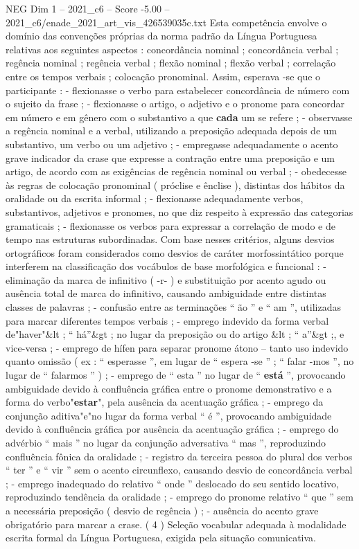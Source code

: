 \begin{textsample}{NEG Dim 1 – 2021\_c6 – Score -5.00 – 2021\_c6/enade\_2021\_art\_vis\_426539035c.txt}
Esta competência envolve o domínio das convenções próprias da norma padrão da Língua Portuguesa relativas aos seguintes aspectos : concordância nominal ; concordância verbal ; regência nominal ; regência verbal ; flexão nominal ; flexão verbal ; correlação entre os tempos verbais ; colocação pronominal.
Assim, esperava -se que o participante : - flexionasse o verbo para estabelecer concordância de número com o sujeito da frase ; - flexionasse o artigo, o adjetivo e o pronome para concordar em número e em gênero com o substantivo a que \textbf{cada} um se refere ; - observasse a regência nominal e a verbal, utilizando a preposição adequada depois de um substantivo, um verbo ou um adjetivo ; - empregasse adequadamente o acento grave indicador da crase que expresse a contração entre uma preposição e um artigo, de acordo com as exigências de regência nominal ou verbal ; - obedecesse às regras de colocação pronominal ( próclise e ênclise ), distintas dos hábitos da oralidade ou da escrita informal ; - flexionasse adequadamente verbos, substantivos, adjetivos e pronomes, no que diz respeito à expressão das categorias gramaticais ; - flexionasse os verbos para expressar a correlação de modo e de tempo nas estruturas subordinadas.
Com base nesses critérios, alguns desvios ortográficos foram considerados como desvios de caráter morfossintático porque interferem na classificação dos vocábulos de base morfológica e funcional : - eliminação da marca de infinitivo ( -r- ) e substituição por acento agudo ou ausência total de marca do infinitivo, causando ambiguidade entre distintas classes de palavras ; - confusão entre as terminações “ ão ” e “ am ”, utilizadas para marcar diferentes tempos verbais ; - emprego indevido da forma verbal de"haver"\&lt ; “ há”\&gt ; no lugar da preposição ou do artigo \&lt ; “ a”\&gt ;, e vice-versa ; - emprego de hífen para separar pronome átono – tanto uso indevido quanto omissão ( ex : “ esperasse ”, em lugar de “ espera -se ” ; “ falar -mos ”, no lugar de “ falarmos ” ) ; - emprego de “ esta ” no lugar de “ \textbf{está} ”, provocando ambiguidade devido à confluência gráfica entre o pronome demonstrativo e a forma do verbo"\textbf{estar}", pela ausência da acentuação gráfica ; - emprego da conjunção aditiva"e"no lugar da forma verbal “ é ”, provocando ambiguidade devido à confluência gráfica por ausência da acentuação gráfica ; - emprego do advérbio “ mais ” no lugar da conjunção adversativa “ mas ”, reproduzindo confluência fônica da oralidade ; - registro da terceira pessoa do plural dos verbos “ ter ” e “ vir ” sem o acento circunflexo, causando desvio de concordância verbal ; - emprego inadequado do relativo “ onde ” deslocado do seu sentido locativo, reproduzindo tendência da oralidade ; - emprego do pronome relativo “ que ” sem a necessária preposição ( desvio de regência ) ; - ausência do acento grave obrigatório para marcar a crase. ( 4 ) Seleção vocabular adequada à modalidade escrita formal da Língua Portuguesa, exigida pela situação comunicativa.

\end{textsample}
